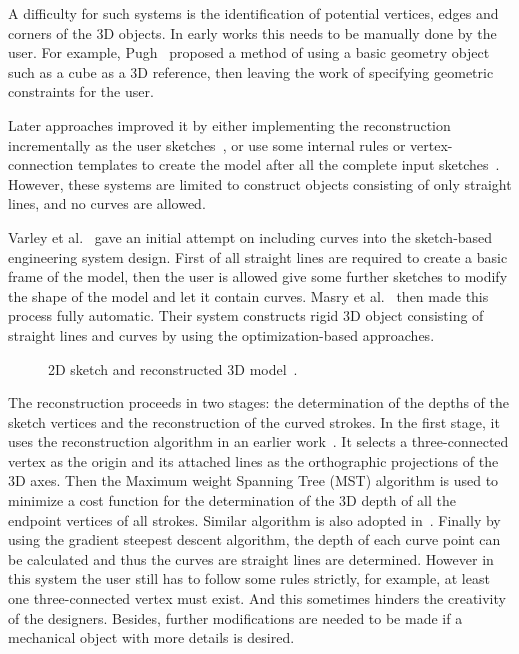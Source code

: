 A difficulty for such systems is the identification of potential vertices, edges and corners of the 3D objects. In early works this needs to be manually done by the user. For example, Pugh~\cite{PD92} proposed a method of using a basic geometry object such as a cube as a 3D reference, then leaving the work of specifying geometric constraints for the user.	

Later approaches improved it by either implementing the reconstruction incrementally as the user sketches~\cite{CNJC03}, or use some internal rules or vertex-connection templates to create the model after all the complete input sketches~\cite{FBSS04,VMS05}. However, these systems are limited to construct objects consisting of only straight lines, and no curves are allowed.

Varley et al.~\cite{PYJH04} gave an initial attempt on including curves into the sketch-based engineering system design. First of all straight lines are required to create a basic frame of the model, then the user is allowed give some further sketches to modify the shape of the model and let it contain curves. Masry et al.~\cite{ML07} then made this process fully automatic. Their system constructs rigid 3D object consisting of straight lines and curves by using the optimization-based approaches.

\begin{figure} [htbp]
\renewcommand{\thesubfigure}{}
  \centering
  \caption{2D sketch and reconstructed 3D model~\cite{ML07}.}
  \label{fig:EnginCreation} %
\end{figure}

The reconstruction proceeds in two stages: the determination of the depths of the sketch vertices and the reconstruction of the curved strokes. In the first stage, it uses the reconstruction algorithm in an earlier work~\cite{KML04}. It selects a three-connected vertex as the origin and its attached lines as the orthographic projections of the 3D axes. Then the Maximum weight Spanning Tree (MST) algorithm is used to minimize a cost function for the determination of the 3D depth of all the endpoint vertices of all strokes. Similar algorithm is also adopted in~\cite{CCCP04}. Finally by using the gradient steepest descent algorithm, the depth of each curve point can be calculated and thus the curves are straight lines are determined. However in this system the user still has to follow some rules strictly, for example, at least one three-connected vertex must exist. And this sometimes hinders the creativity of the designers. Besides, further modifications are needed to be made if a mechanical object with more details is desired.


